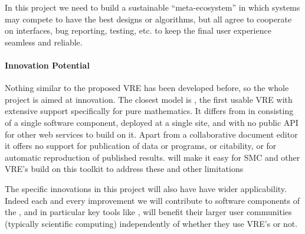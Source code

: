 In this project we need to build a sustainable ``meta-ecosystem'' in
which systems may compete to have the best designs or algorithms, but
all agree to cooperate on interfaces, bug reporting, testing, etc. to
keep the final user experience seamless and reliable.


\paragraph{Innovation Potential}

Nothing similar to the proposed \TheProject VRE has been developed
before, so the whole project is aimed at innovation. The closest model
is \SMC, the first usable VRE with extensive support specifically for
pure mathematics.
It differs from \TheProject in consisting of a single software
component, deployed at a single site, and with no public API
for other web services to build on it.
Apart from a collaborative document editor it offers no support for
publication of data or programs, or citability, or for automatic
reproduction of published results.
\TheProject will make it easy for SMC and other VRE's build on this
toolkit to address these and other limitations

The specific innovations in this project will also have have wider
applicability. Indeed each and every improvement we will contribute to
software components of the \TheProject, and in particular key tools
like \Jupyter, will benefit their larger user communities (typically
scientific computing) independently of whether they use VRE's or not.



